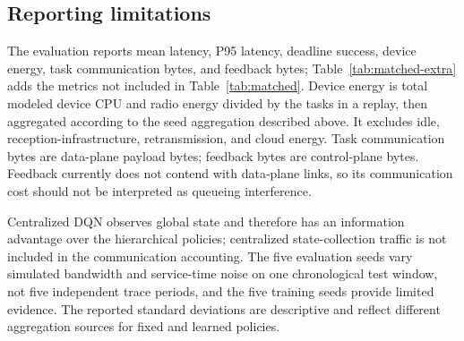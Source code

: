 \subsection{Reporting limitations}
The evaluation reports mean latency, P95 latency, deadline success,
device energy, task communication bytes, and feedback bytes; Table~\ref{tab:matched-extra}
adds the metrics not included in Table~\ref{tab:matched}. Device energy is
total modeled device CPU
and radio energy divided by the tasks in a replay, then aggregated according
to the seed aggregation described above. It excludes idle,
reception-infrastructure, retransmission, and cloud energy. Task communication bytes are data-plane payload bytes; feedback bytes are
control-plane bytes. Feedback currently does not contend with data-plane
links, so its communication cost should not be interpreted as queueing
interference.

Centralized DQN observes global state and therefore has an information
advantage over the hierarchical policies; centralized state-collection
traffic is not included in the communication accounting. The five evaluation
seeds vary simulated bandwidth and service-time noise on one chronological
test window, not five independent trace periods, and the five training seeds
provide limited evidence. The reported standard deviations are descriptive
and reflect different aggregation sources for fixed and learned policies.
